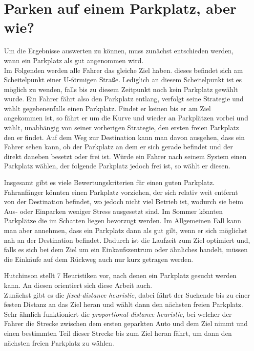 \section{Parken auf einem Parkplatz, aber wie?}

Um die Ergebnisse auswerten zu können, muss zunächst entschieden werden, wann ein Parkplatz als gut angenommen wird.\\
Im Folgenden werden alle Fahrer das gleiche Ziel haben. dieses befindet sich am Scheitelpunkt einer U-förmigen Straße. Lediglich an diesem Scheitelpunkt ist es möglich zu wenden, falls bis zu diesem Zeitpunkt noch kein Parkplatz gewählt wurde. Ein Fahrer fährt also den Parkplatz entlang, verfolgt seine Strategie und wählt gegebenenfalls einen Parkplatz. Findet er keinen bis er am Ziel angekommen ist, so fährt er um die Kurve und wieder an Parkplätzen vorbei und wählt, unabhängig von seiner vorherigen Strategie, den ersten freien Parkplatz den er findet. Auf dem Weg zur Destination kann man davon ausgehen, dass ein Fahrer sehen kann, ob der Parkplatz an dem er sich gerade befindet und der direkt daneben besetzt oder frei ist. Würde ein Fahrer nach seinem System einen Parkplatz wählen, der folgende Parkplatz jedoch frei ist, so wählt er diesen.

Insgesamt gibt es viele Bewertungskriterien für einen guten Parkplatz. Fahranfänger könnten einen Parkplatz vorziehen, der sich relativ weit entfernt von der Destination befindet, wo jedoch nicht viel Betrieb ist, wodurch sie beim Aus- oder Einparken weniger Stress ausgesetzt sind. Im Sommer könnten Parkplätze die im Schatten liegen bevorzugt werden. Im Allgemeinen Fall kann man aber annehmen, dass ein Parkplatz dann als gut gilt, wenn er sich möglichst nah an der Destination befindet. Dadurch ist die Laufzeit zum Ziel optimiert und, falls es sich bei dem Ziel um ein Einkaufszentrum oder ähnliches handelt, müssen die Einkäufe auf dem Rückweg auch nur kurz getragen werden.

Hutchinson stellt 7 Heuristiken vor, nach denen ein Parkplatz gesucht werden kann. An diesen orientiert sich diese Arbeit auch. \\
Zunächst gibt es die \emph{fixed-distance heuristic}, dabei fährt der Suchende bis zu einer festen Distanz an das Ziel heran und wählt dann den nächsten freien Parkplatz. Sehr ähnlich funktioniert die \emph{proportional-distance heuristic}, bei welcher der Fahrer die Strecke zwischen dem ersten geparkten Auto und dem Ziel nimmt und einen bestimmten Teil dieser Strecke bis zum Ziel heran fährt, um dann den nächsten freien Parkplatz zu wählen.


